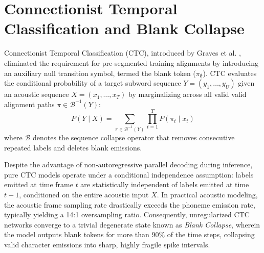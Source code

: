 \section{Connectionist Temporal Classification and Blank Collapse}
Connectionist Temporal Classification (CTC), introduced by Graves et al. \cite{graves2006connectionist}, eliminated the requirement for pre-segmented training alignments by introducing an auxiliary null transition symbol, termed the blank token ($\pi_\emptyset$). CTC evaluates the conditional probability of a target subword sequence $Y = (y_1, \dots, y_U)$ given an acoustic sequence $X = (x_1, \dots, x_T)$ by marginalizing across all valid valid alignment paths $\pi \in \mathcal{B}^{-1}(Y)$:
\begin{equation}
    P(Y \mid X) = \sum_{\pi \in \mathcal{B}^{-1}(Y)} \prod_{t=1}^T P(\pi_t \mid x_t)
\end{equation}
where $\mathcal{B}$ denotes the sequence collapse operator that removes consecutive repeated labels and deletes blank emissions.

Despite the advantage of non-autoregressive parallel decoding during inference, pure CTC models operate under a conditional independence assumption: labels emitted at time frame $t$ are statistically independent of labels emitted at time $t-1$, conditioned on the entire acoustic input $X$. In practical acoustic modeling, the acoustic frame sampling rate drastically exceeds the phoneme emission rate, typically yielding a 14:1 oversampling ratio. Consequently, unregularized CTC networks converge to a trivial degenerate state known as \textit{Blank Collapse}, wherein the model outputs blank tokens for more than 90\% of the time steps, collapsing valid character emissions into sharp, highly fragile spike intervals.


